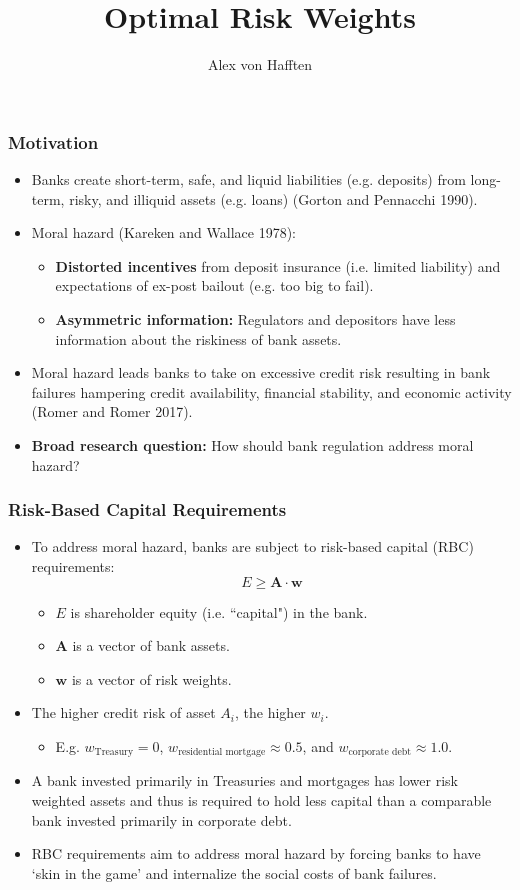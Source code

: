 \documentclass{beamer}
\title[Optimal Risk Weights]{Optimal Risk Weights}
\author{Alex von Hafften}
\institute{UW-Madison}
\begin{document}
\begin{frame}
\titlepage
\end{frame}

\begin{frame}
\frametitle{Motivation}
\begin{itemize}[<+->]
\item Banks create short-term, safe, and liquid liabilities (e.g. deposits) from long-term, risky, and illiquid assets (e.g. loans) (Gorton and Pennacchi 1990).
\bigskip
\item Moral hazard (Kareken and Wallace 1978):
\bigskip
\begin{itemize}[<+->]
\item \textbf{Distorted incentives} from deposit insurance (i.e. limited liability) and expectations of ex-post bailout (e.g. too big to fail).
\bigskip
\item \textbf{Asymmetric information:} Regulators and depositors have less information about the riskiness of bank assets.
\end{itemize}
\bigskip
\item Moral hazard leads banks to take on excessive credit risk resulting in bank failures hampering credit availability, financial stability, and economic activity (Romer and Romer 2017).
\bigskip
\item \textbf{Broad research question:} How should bank regulation address moral hazard?
\end{itemize}
\end{frame}

\begin{frame}
\frametitle{Risk-Based Capital Requirements}
\begin{itemize}[<+->]
\item To address moral hazard, banks are subject to risk-based capital (RBC) requirements: 
$$
E \ge \mathbf{A} \cdot \mathbf{w}
$$
\begin{itemize}[<+->]
\item $E$ is shareholder equity (i.e. ``capital") in the bank.
\item $\mathbf{A}$ is a vector of bank assets.
\item $\mathbf{w}$ is a vector of risk weights.
\end{itemize}
\bigskip
\item The higher credit risk of asset $A_i$, the higher $w_i$.
\begin{itemize}[<+->]
\item E.g. $w_{\text{Treasury}} = 0$, $w_{\text{residential mortgage}} \approx 0.5$, and $w_{\text{corporate debt}} \approx 1.0$.
\end{itemize}
\bigskip
\item A bank invested primarily in Treasuries and mortgages has lower risk weighted assets and thus is required to hold less capital than a com­parable bank invested primarily in corporate debt.
\bigskip
\item RBC requirements aim to address moral hazard by forcing banks to have ‘skin in the game’ and internalize the social costs of bank failures.
\end{itemize}
\end{frame}
\end{document}
